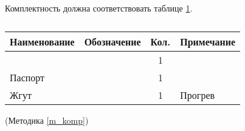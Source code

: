 \begin{samepage}
	Комплектность должна соответствовать таблице \ref{tab:tab_komp}.
	\begin{table}[ht]
		\centering
		\captionsetup{margin=22.5mm}
		\caption{ }\label{tab:tab_komp}
		\begin{tabular}{|l|l|c|l|}
			\hline
	Наименование & Обозначение & Кол. & Примечание \T \\ \hline
	\dut & \RN	& 1	& \T \\ \hline
	Паспорт & \RN ПС \T & 1 & \\ \hline
	Жгут & \preheatRN \T & 1 & Прогрев \\ \hline
		\end{tabular}
	\end{table}
	
	\begin{flushright}
		(Методика \ref{m_komp})
	\end{flushright}
\end{samepage}